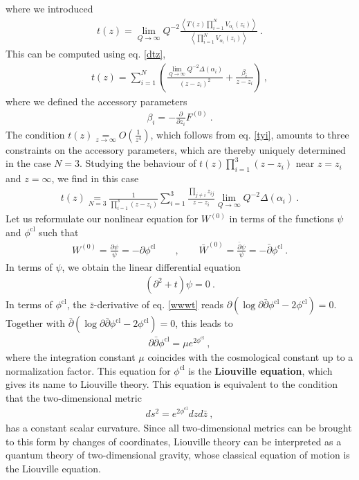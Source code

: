\documentclass[12pt, a4paper, notitlepage, twoside]{report}
\numberwithin{equation}{section}
\theoremstyle{break}
\begin{document}
where we introduced
\begin{align}
 t(z) = \underset{Q\to \infty}{\lim} Q^{-2} \frac{\left\langle T(z) \prod_{i=1}^N V_{\alpha_i}(z_i) \right\rangle}{\left\langle \prod_{i=1}^N V_{\alpha_i}(z_i) \right\rangle}\ .
\end{align}
This can be computed using eq. \eqref{dtz}, 
\begin{align}
 t(z) = \sum_{i=1}^N \left( \frac{\underset{Q\to\infty}{\lim} Q^{-2}\Delta(\alpha_i)}{(z-z_i)^2} + \frac{\beta_i}{z-z_i} \right)\ ,
\label{tzs}
\end{align}
where we defined the accessory parameters
\begin{align}
 \beta_i = -{\frac{\partial}{\partial z_i}} F^{(0)}\ .
\end{align}
The condition $t(z) \underset{z\to \infty}{=} O(\frac{1}{z^4})$, which follows from eq. \eqref{tyi}, amounts to three constraints on the accessory parameters, which are thereby uniquely determined in the case $N= 3$. Studying the behaviour of $t(z)\prod_{i=1}^3(z-z_i)$ near $z=z_i$ and $z=\infty$, we find in this case
\begin{align}
 t(z) \underset{N=3}{=} \frac{1}{\prod_{i=1}^3(z-z_i)} \sum_{i=1}^3 \frac{\prod_{j\neq i} z_{ij}}{z-z_i}\underset{Q\to\infty}{\lim} Q^{-2}\Delta(\alpha_i)\ .
\end{align}
Let us reformulate our nonlinear equation for $W^{(0)}$ in terms of the functions $\psi$ and $\phi^\text{cl}$ such that
\begin{align}
 W^{(0)} = \frac{\partial\psi}{\psi} = -\partial \phi^\text{cl} \qquad , \qquad \bar W^{(0)} = \frac{\bar\partial\psi}{\psi}= -\bar\partial \phi^\text{cl}\ .
\end{align}
In terms of $\psi$, we obtain the linear differential equation
\begin{align}
 \boxed{ (\partial^2 + t ) \psi = 0 } \ .
 \label{dtp}
\end{align}
In terms of $\phi^\text{cl}$, the $\bar{z}$-derivative of eq. \eqref{wwwt} reads $\partial\left(\log \partial\bar{\partial}\phi^\text{cl} -2\phi^\text{cl}\right)=0$. Together with $\bar{\partial} \left(\log \partial\bar{\partial}\phi^\text{cl} -2\phi^\text{cl}\right)=0$, this leads to 
\begin{align}
 \partial\bar{\partial}\phi^\text{cl} = \mu e^{2\phi^\text{cl}}\ ,
 \label{phieq}
\end{align}
where the integration constant $\mu$ coincides with the cosmological constant up to a normalization factor.
This equation for $\phi^\text{cl}$ is the \textbf{\boldmath Liouville equation}, which gives its name to Liouville theory.
This equation is equivalent to the condition that the two-dimensional metric
\begin{align}
 ds^2 = e^{2\phi^\text{cl}} dz d\bar{z}\ ,
\end{align}
has a constant scalar curvature.
Since all two-dimensional metrics can be brought to this form by changes of coordinates, Liouville theory can be interpreted as a quantum theory of two-dimensional gravity, whose classical equation of motion is the Liouville equation.
\end{document}
